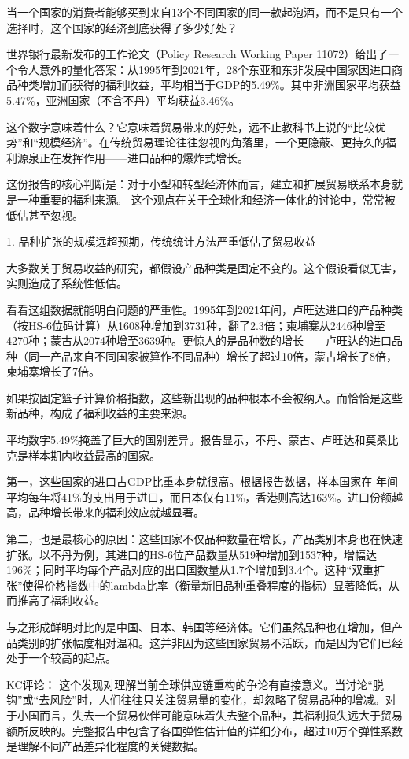 \documentclass[11pt]{ctexart}
\begin{document}
当一个国家的消费者能够买到来自13个不同国家的同一款起泡酒，而不是只有一个选择时，这个国家的经济到底获得了多少好处？

世界银行最新发布的工作论文（Policy Research Working Paper 11072）给出了一个令人意外的量化答案：从1995年到2021年，28个东亚和东非发展中国家因进口商品种类增加而获得的福利收益，平均相当于GDP的5.49\%。其中非洲国家平均获益5.47\%，亚洲国家（不含不丹）平均获益3.46\%。

这个数字意味着什么？它意味着贸易带来的好处，远不止教科书上说的“比较优势”和“规模经济”。在传统贸易理论往往忽视的角落里，一个更隐蔽、更持久的福利源泉正在发挥作用——进口品种的爆炸式增长。

这份报告的核心判断是：对于小型和转型经济体而言，建立和扩展贸易联系本身就是一种重要的福利来源。 这个观点在关于全球化和经济一体化的讨论中，常常被低估甚至忽视。

1. 品种扩张的规模远超预期，传统统计方法严重低估了贸易收益

大多数关于贸易收益的研究，都假设产品种类是固定不变的。这个假设看似无害，实则造成了系统性低估。

看看这组数据就能明白问题的严重性。1995年到2021年间，卢旺达进口的产品种类（按HS-6位码计算）从1608种增加到3731种，翻了2.3倍；柬埔寨从2446种增至4270种；蒙古从2074种增至3639种。更惊人的是品种数的增长——卢旺达的进口品种（同一产品来自不同国家被算作不同品种）增长了超过10倍，蒙古增长了8倍，柬埔寨增长了7倍。

如果按固定篮子计算价格指数，这些新出现的品种根本不会被纳入。而恰恰是这些新品种，构成了福利收益的主要来源。

平均数字5.49\%掩盖了巨大的国别差异。报告显示，不丹、蒙古、卢旺达和莫桑比克是样本期内收益最高的国家。

第一，这些国家的进口占GDP比重本身就很高。根据报告数据，样本国家在 年间平均每年将41\%的支出用于进口，而日本仅有11\%，香港则高达163\%。进口份额越高，品种增长带来的福利效应就越显著。

第二，也是最核心的原因：这些国家不仅品种数量在增长，产品类别本身也在快速扩张。以不丹为例，其进口的HS-6位产品数量从519种增加到1537种，增幅达196\%；同时平均每个产品对应的出口国数量从1.7个增加到3.4个。这种“双重扩张”使得价格指数中的lambda比率（衡量新旧品种重叠程度的指标）显著降低，从而推高了福利收益。

与之形成鲜明对比的是中国、日本、韩国等经济体。它们虽然品种也在增加，但产品类别的扩张幅度相对温和。这并非因为这些国家贸易不活跃，而是因为它们已经处于一个较高的起点。

KC评论： 这个发现对理解当前全球供应链重构的争论有直接意义。当讨论“脱钩”或“去风险”时，人们往往只关注贸易量的变化，却忽略了贸易品种的增减。对于小国而言，失去一个贸易伙伴可能意味着失去整个品种，其福利损失远大于贸易额所反映的。完整报告中包含了各国弹性估计值的详细分布，超过10万个弹性系数是理解不同产品差异化程度的关键数据。
\end{document}
